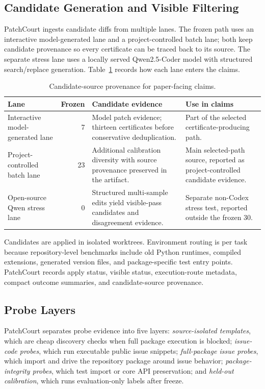 \documentclass[conference]{IEEEtran}
\newcommand{\patchcourt}{PatchCourt\xspace}
\begin{document}
\subsection{Candidate Generation and Visible Filtering}

\patchcourt ingests candidate diffs from multiple lanes.
The frozen path uses an interactive model-generated lane and a project-controlled batch lane; both keep candidate provenance so every certificate can be traced back to its source.
The separate stress lane uses a locally served Qwen2.5-Coder model with structured search/replace generation.
Table~\ref{tab:candidate-provenance} records how each lane enters the claims.

\begin{table}[t]
\caption{Candidate-source provenance for paper-facing claims.}
\label{tab:candidate-provenance}
\centering
\scriptsize
\begin{tabularx}{\textwidth}{p{}rXX}
\toprule
Lane & Frozen & Candidate evidence & Use in claims \\
\midrule
Interactive model-generated lane & 7 & Model patch evidence; thirteen certificates before conservative deduplication. & Part of the selected certificate-producing path. \\
Project-controlled batch lane & 23 & Additional calibration diversity with source provenance preserved in the artifact. & Main selected-path source, reported as project-controlled candidate evidence. \\
Open-source Qwen stress lane & 0 & Structured multi-sample edits yield visible-pass candidates and disagreement evidence. & Separate non-Codex stress test, reported outside the frozen 30. \\
\bottomrule
\end{tabularx}
\end{table}

Candidates are applied in isolated worktrees.
Environment routing is per task because repository-level benchmarks include old Python runtimes, compiled extensions, generated version files, and package-specific test entry points.
\patchcourt records apply status, visible status, execution-route metadata, compact outcome summaries, and candidate-source provenance.

\subsection{Probe Layers}

\patchcourt separates probe evidence into five layers:
\emph{source-isolated templates}, which are cheap discovery checks when full package execution is blocked;
\emph{issue-code probes}, which run executable public issue snippets;
\emph{full-package issue probes}, which import and drive the repository package around issue behavior;
\emph{package-integrity probes}, which test import or core API preservation; and
\emph{held-out calibration}, which runs evaluation-only labels after freeze.
\end{document}

